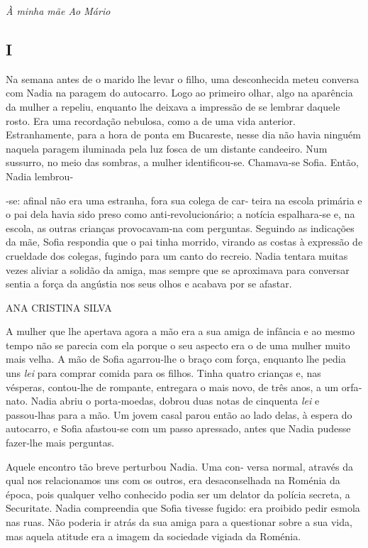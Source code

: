 \emph{À minha mãe Ao Mário}

\subsection{I}

Na semana antes de o marido lhe levar o filho, uma desconhecida meteu
conversa com Nadia na paragem do autocarro. Logo ao primeiro olhar, algo
na aparência da mulher a repeliu, enquanto lhe deixava a impressão de se
lembrar daquele rosto. Era uma recordação nebulosa, como a de uma vida
anterior. Estranhamente, para a hora de ponta em Bucareste, nesse dia
não havia ninguém naquela paragem iluminada pela luz fosca de um
distante candeeiro. Num sussurro, no meio das sombras, a mulher
identificou‑se. Chamava‑se Sofia. Então, Nadia lembrou‑

‑se: afinal não era uma estranha, fora sua colega de car‑ teira na
escola primária e o pai dela havia sido preso como anti‑revolucionário;
a notícia espalhara‑se e, na escola, as outras crianças provocavam‑na
com perguntas. Seguindo as indicações da mãe, Sofia respondia que o pai
tinha morrido, virando as costas à expressão de crueldade dos colegas,
fugindo para um canto do recreio. Nadia tentara muitas vezes aliviar a
solidão da amiga, mas sempre que se aproximava para conversar sentia a
força da angústia nos seus olhos e acabava por se afastar.

ANA CRISTINA SILVA

A mulher que lhe apertava agora a mão era a sua amiga de infância e ao
mesmo tempo não se parecia com ela porque o seu aspecto era o de uma
mulher muito mais velha. A mão de Sofia agarrou‑lhe o braço com força,
enquanto lhe pedia uns \emph{lei }para comprar comida para os filhos.
Tinha quatro crianças e, nas vésperas, contou‑lhe de rompante, entregara
o mais novo, de três anos, a um orfa‑ nato. Nadia abriu o porta‑moedas,
dobrou duas notas de cinquenta \emph{lei }e passou‑lhas para a mão. Um
jovem casal parou então ao lado delas, à espera do autocarro, e Sofia
afastou‑se com um passo apressado, antes que Nadia pudesse fazer‑lhe
mais perguntas.

Aquele encontro tão breve perturbou Nadia. Uma con‑ versa normal,
através da qual nos relacionamos uns com os outros, era desaconselhada
na Roménia da época, pois qualquer velho conhecido podia ser um delator
da polícia secreta, a Securitate. Nadia compreendia que Sofia tivesse
fugido: era proibido pedir esmola nas ruas. Não poderia ir atrás da sua
amiga para a questionar sobre a sua vida, mas aquela atitude era a
imagem da sociedade vigiada da Roménia.

